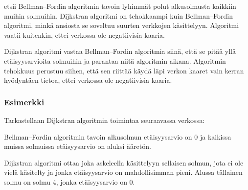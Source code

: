 
 etsii Bellman–Fordin
algoritmin tavoin lyhimmät polut
alkusolmusta kaikkiin muihin solmuihin.
Dijkstran algoritmi on tehokkaampi kuin
Bellman–Fordin algoritmi,
minkä ansiosta se soveltuu suurten
verkkojen käsittelyyn.
Algoritmi vaatii kuitenkin,
ettei verkossa ole negatiivisia kaaria.

Dijkstran algoritmi vastaa
Bellman–Fordin algoritmia siinä,
että se pitää
yllä etäisyysarvioita solmuihin
ja parantaa niitä algoritmin aikana.
Algoritmin tehokkuus perustuu
siihen, että sen riittää käydä läpi
verkon kaaret vain kerran
hyödyntäen tietoa,
ettei verkossa ole negatiivisia kaaria.

\subsubsection{Esimerkki}

Tarkastellaan Dijkstran algoritmin toimintaa
seuraavassa verkossa:
\begin{center}
\end{center}
Bellman–Fordin algoritmin tavoin
alkusolmun etäisyysarvio on 0
ja kaikissa muissa solmuissa etäisyysarvio
on aluksi ääretön.

Dijkstran algoritmi
ottaa joka askeleella käsittelyyn
sellaisen solmun,
jota ei ole vielä käsitelty
ja jonka etäisyysarvio on
mahdollisimman pieni.
Alussa tällainen solmu on solmu 4,
jonka etäisyysarvio on 0.

